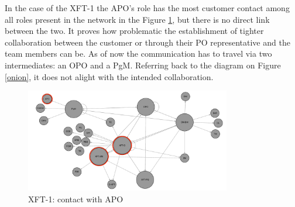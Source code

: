 \begin{description}
   
      
In the case of the \ac{XFT}-1 the \ac{APO}'s role has the most customer contact among all roles present in the network in the Figure \ref{fig:ms2-apo}, but there is no direct link between the two. It proves how problematic the establishment of tighter collaboration between the customer or through their \ac{PO} representative and the team members can be. As of now the communication has to travel via two intermediates: an \ac{OPO} and a \ac{PgM}. Referring back to the diagram on Figure \ref{onion}, it does not alight with the intended collaboration.

\begin{figure}[h!]
  \centering
  \includegraphics[width=0.8\textwidth]{figures/ms2-apo.pdf}
  \caption{XFT-1: contact with APO}
  \label{fig:ms2-apo}
\end{figure}

\end{description}
